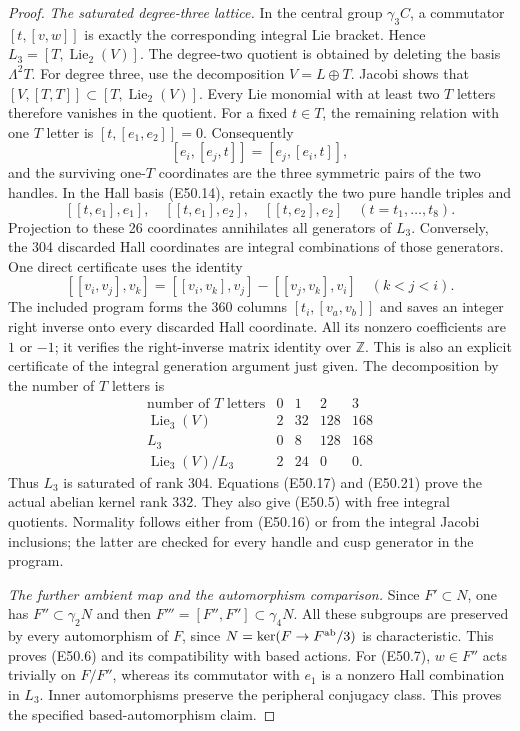 \begin{proof}
\emph{The saturated degree-three lattice.}
In the central group $\gamma_3C$, a
commutator $[t,[v,w]]$ is exactly the
corresponding integral Lie bracket.
Hence $L_3=[T,\operatorname{Lie}_2(V)]$.
The degree-two quotient is obtained by
deleting the basis $\Lambda^2T$.
For degree three, use the decomposition
$V=L\oplus T$. Jacobi shows that
$[V,[T,T]]\subset[T,\operatorname{Lie}_2(V)]$.
Every Lie monomial with at least two
$T$ letters therefore vanishes in the
quotient. For a fixed $t\in T$, the
remaining relation with one $T$ letter
is $[t,[e_1,e_2]]=0$. Consequently
\[
 [e_i,[e_j,t]]=[e_j,[e_i,t]],
 \tag{E50.18}
\]
and the surviving one-$T$ coordinates
are the three symmetric pairs of the
two handles. In the Hall basis
(E50.14), retain exactly the two pure
handle triples and
\[
 [[t,e_1],e_1],\quad
 [[t,e_1],e_2],\quad
 [[t,e_2],e_2]
 \quad(t=t_1,\ldots,t_8).
 \tag{E50.19}
\]
Projection to these 26 coordinates
annihilates all generators of $L_3$.
Conversely, the 304 discarded Hall
coordinates are integral combinations
of those generators. One direct
certificate uses the identity
\[
 [[v_i,v_j],v_k]
   =[[v_i,v_k],v_j]-[[v_j,v_k],v_i]
                  \quad(k<j<i).
 \tag{E50.20}
\]
The included program forms the 360
columns $[t_i,[v_a,v_b]]$ and saves an
integer right inverse onto every
discarded Hall coordinate. All its
nonzero coefficients are $1$ or $-1$;
it verifies the right-inverse matrix
identity over $\mathbb Z$. This is also
an explicit certificate of the
integral generation argument just
given. The decomposition by the
number of $T$ letters is
\[
 \begin{array}{c|rrrr}
 \text{number of $T$ letters}&0&1&2&3\\ \hline
 \operatorname{Lie}_3(V)&2&32&128&168\\
 L_3&0&8&128&168\\
 \operatorname{Lie}_3(V)/L_3&2&24&0&0.
 \end{array}
 \tag{E50.21}
\]
Thus $L_3$ is saturated of rank 304.
Equations (E50.17) and (E50.21) prove
the actual abelian kernel rank 332.
They also give (E50.5) with free
integral quotients. Normality follows
either from (E50.16) or from the
integral Jacobi inclusions; the latter
are checked for every handle and cusp
generator in the program.

\emph{The further ambient map and the
automorphism comparison.}
Since $F'\subset N$, one has
$F''\subset\gamma_2N$ and then
$F'''=[F'',F'']\subset\gamma_4N$.
All these subgroups are preserved by
every automorphism of $F$, since
$N=\ker(F\to F^{\rm ab}/3)$ is
characteristic. This proves (E50.6)
and its compatibility with based
actions. For (E50.7), $w\in F''$
acts trivially on $F/F''$, whereas its
commutator with $e_1$ is a nonzero
Hall combination in $L_3$. Inner
automorphisms preserve the peripheral
conjugacy class. This proves the
specified based-automorphism claim.


\end{proof}
